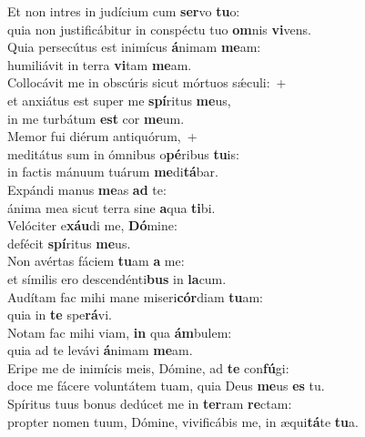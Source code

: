 \evenverse Et non intres in judícium cum \textbf{ser}vo \textbf{tu}o:~\*\\
\evenverse quia non justificábitur in conspéctu tuo \textbf{om}nis \textbf{vi}vens.\\
\oddverse Quia persecútus est inimícus \textbf{á}nimam \textbf{me}am:~\*\\
\oddverse humiliávit in terra \textbf{vi}tam \textbf{me}am.\\
\evenverse Collocávit me in obscúris sicut mórtuos sǽculi:~+\\
\evenverse  et anxiátus est super me \textbf{spí}ritus \textbf{me}us,~\*\\
\evenverse in me turbátum \textbf{est} cor \textbf{me}um.\\
\oddverse Memor fui diérum antiquórum,~+\\
\oddverse  meditátus sum in ómnibus o\textbf{pé}ribus \textbf{tu}is:~\*\\
\oddverse in factis mánuum tuárum \textbf{me}di\textbf{tá}bar.\\
\evenverse Expándi manus \textbf{me}as \textbf{ad} te:~\*\\
\evenverse ánima mea sicut terra sine \textbf{a}qua \textbf{ti}bi.\\
\oddverse Velóciter e\textbf{xáu}di me, \textbf{Dó}mine:~\*\\
\oddverse defécit \textbf{spí}ritus \textbf{me}us.\\
\evenverse Non avértas fáciem \textbf{tu}am \textbf{a} me:~\*\\
\evenverse et símilis ero descendénti\textbf{bus} in \textbf{la}cum.\\
\oddverse Audítam fac mihi mane miseri\textbf{cór}diam \textbf{tu}am:~\*\\
\oddverse quia in \textbf{te} spe\textbf{rá}vi.\\
\evenverse Notam fac mihi viam, \textbf{in} qua \textbf{ám}bulem:~\*\\
\evenverse quia ad te levávi \textbf{á}nimam \textbf{me}am.\\
\oddverse Eripe me de inimícis meis, Dómine, ad \textbf{te} con\textbf{fú}gi:~\*\\
\oddverse doce me fácere voluntátem tuam, quia Deus \textbf{me}us \textbf{es} tu.\\
\evenverse Spíritus tuus bonus dedúcet me in \textbf{ter}ram \textbf{re}ctam:~\*\\
\evenverse propter nomen tuum, Dómine, vivificábis me, in æqui\textbf{tá}te \textbf{tu}a.\\

